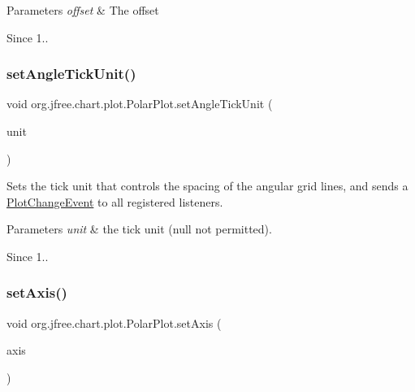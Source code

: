 \begin{DoxyParams}{Parameters}
{\em offset} & The offset \\
\hline
\end{DoxyParams}
\begin{DoxySince}{Since}
1.. 
\end{DoxySince}
\mbox{\label{classorg_1_1jfree_1_1chart_1_1plot_1_1_polar_plot_adc9661a3cd1aa24c986f5e4fdadd6e3a}} 
\subsubsection{\texorpdfstring{set\+Angle\+Tick\+Unit()}{setAngleTickUnit()}}
{\footnotesize\ttfamily void org.\+jfree.\+chart.\+plot.\+Polar\+Plot.\+set\+Angle\+Tick\+Unit (\begin{DoxyParamCaption}\item[{\mbox{\hyperlink{classorg_1_1jfree_1_1chart_1_1axis_1_1_tick_unit}{Tick\+Unit}}}]{unit }\end{DoxyParamCaption})}

Sets the tick unit that controls the spacing of the angular grid lines, and sends a \mbox{\hyperlink{}{Plot\+Change\+Event}} to all registered listeners.


\begin{DoxyParams}{Parameters}
{\em unit} & the tick unit ({\ttfamily null} not permitted).\\
\hline
\end{DoxyParams}
\begin{DoxySince}{Since}
1.. 
\end{DoxySince}
\mbox{\label{classorg_1_1jfree_1_1chart_1_1plot_1_1_polar_plot_a31e8be5c37523541ee64ce073dcf4f52}} 
\subsubsection{\texorpdfstring{set\+Axis()}{setAxis()}\hspace{0.1cm}{\footnotesize\ttfamily [1/3]}}
{\footnotesize\ttfamily void org.\+jfree.\+chart.\+plot.\+Polar\+Plot.\+set\+Axis (\begin{DoxyParamCaption}\item[{\mbox{\hyperlink{classorg_1_1jfree_1_1chart_1_1axis_1_1_value_axis}{Value\+Axis}}}]{axis }\end{DoxyParamCaption})}

